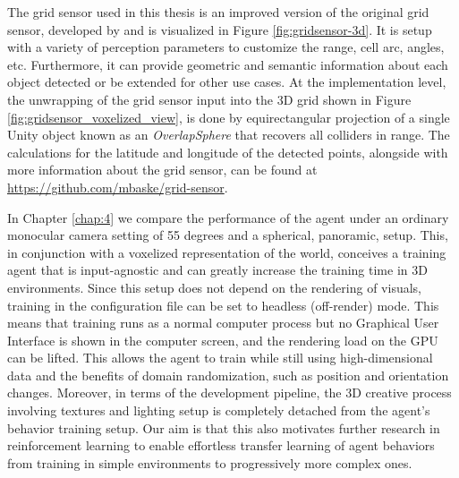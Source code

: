 The grid sensor used in this thesis is an improved version of the original grid sensor, developed by \textcite{github-mbaske-gridsensor} and is visualized in Figure \ref{fig:gridsensor-3d}. It is setup with a variety of perception parameters to customize the range, cell arc, angles, etc. Furthermore, it can provide geometric and semantic information about each object detected or be extended for other use cases. At the implementation level, the unwrapping of the grid sensor input into the 3D grid shown in Figure \ref{fig:gridsensor_voxelized_view}, is done by equirectangular projection of a single Unity object known as an \textit{OverlapSphere} that recovers all colliders in range. The calculations for the latitude and longitude of the detected points, alongside with more information about the grid sensor, can be found at \url{https://github.com/mbaske/grid-sensor}. 




In Chapter \ref{chap:4} we compare the performance of the agent under an ordinary monocular camera setting of 55 degrees and a spherical, panoramic, setup. 
This, in conjunction with a voxelized representation of the world, conceives a training agent that is input-agnostic and can greatly increase the training time in 3D environments. 
Since this setup does not depend on the rendering of visuals, training in the configuration file can be set to headless (off-render) mode. This means that training runs as a normal computer process but no Graphical User Interface is shown in the computer screen, and the rendering load on the GPU can be lifted. This allows the agent to train while still using high-dimensional data and the benefits of domain randomization, such as position and orientation changes. Moreover, in terms of the development pipeline, the 3D creative process involving textures and lighting setup is completely detached from the agent's behavior training setup. 
Our aim is that this also motivates further research in reinforcement learning to enable effortless transfer learning of agent behaviors from training in simple environments to progressively more complex ones. 


